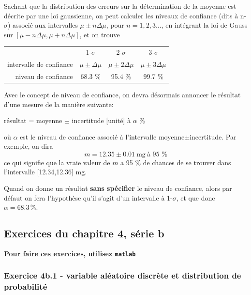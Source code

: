 \documentclass[main.tex]{subfiles}
\begin{document}
Sachant que la distribution des erreurs sur la détermination de la moyenne est décrite par une loi gaussienne, on peut calculer les niveaux de confiance (dits à n-$\sigma$) associé aux intervalles $\mu\pm n\Delta\mu$, pour $n=1,2,3\dots$, en intégrant la loi de Gauss sur $[\mu-n\Delta\mu,\mu+n\Delta\mu]$, et on trouve
\begin{center}
    \begin{tabular}{r|ccc}
                                & 1-$\sigma$        & 2-$\sigma$         & 3-$\sigma$         \\
        intervalle de confiance & $\mu\pm\Delta\mu$ & $\mu\pm2\Delta\mu$ & $\mu\pm3\Delta\mu$ \\
        niveau de confiance     & 68.3 \%           & 95.4 \%            & 99.7 \%
    \end{tabular}
\end{center}

Avec le concept de niveau de confiance, on devra désormais annoncer le résultat d'une mesure de la manière suivante:
\begin{center}
    résultat = moyenne $\pm$ incertitude [unité] à $\alpha$ \%
\end{center}
où $\alpha$ est le niveau de confiance associé à l'intervalle moyenne$\pm$incertitude. Par exemple, on dira
$$
    m=12.35\pm0.01\ \text{mg}\ \text{à 95 \%}
$$
ce qui signifie que la vraie valeur de $m$ a 95 \% de chances de se trouver dans l'intervalle [12.34,12.36] mg.

Quand on donne un résultat \textbf{sans spécifier} le niveau de confiance, alors par défaut on fera l'hypothèse qu'il s'agit d'un intervalle à 1-$\sigma$, et que donc $\alpha=68.3\,\%$.

\fi
\iftrue

\pagebreak
\newpage


\subsection{Exercices du chapitre 4, série b}

\begin{center}
    \Large \bf {\underline{Pour faire ces exercices, utilisez \texttt{matlab}}}
\end{center}

\subsubsection*{Exercice 4b.1 - variable aléatoire discrète et distribution de probabilité}
\end{document}
